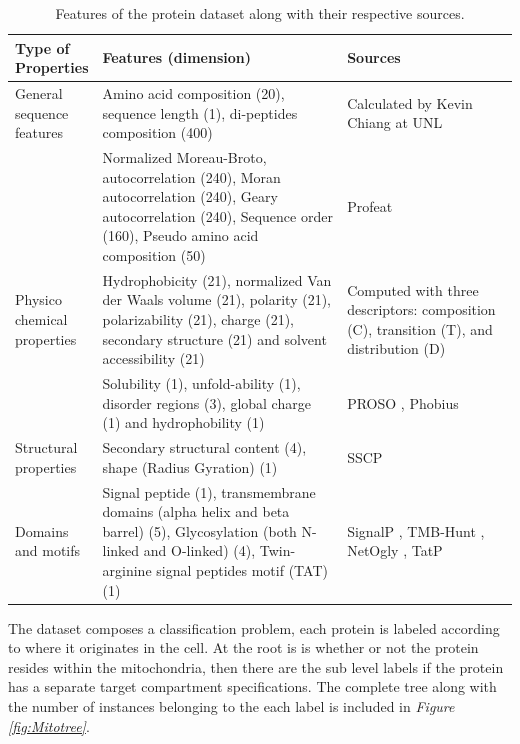 \documentclass[ms]{nuthesis}
\begin{document}
\FloatBarrier
\begin{table}[H]
  \centering
  \small
  \caption{Features of the protein dataset along with their respective sources.}
  \label{tab:featureList}
  \begin{tabular}{|p{0.15\linewidth}|p{0.5\linewidth}|p{0.35\linewidth}|} \toprule
    Type of Properties & Features (dimension) & Sources \\ \midrule
    General sequence features & Amino acid composition (20), sequence length (1),
     di-peptides composition (400) & Calculated by Kevin Chiang at UNL \cite{bioPoster} \\
     & Normalized Moreau-Broto, autocorrelation
     (240), Moran autocorrelation (240), Geary autocorrelation (240),
     Sequence order (160), Pseudo amino acid composition (50) & Profeat \cite{PROFEAT1} \\ \midrule
    Physico chemical properties &  Hydrophobicity (21), normalized Van der Waals volume (21),
    polarity (21), polarizability (21), charge (21), secondary structure (21)
    and solvent accessibility (21) & Computed with three descriptors: composition (C),
    transition (T), and distribution (D) \cite{Cui2} \\
     & Solubility (1), unfold-ability (1),
    disorder regions (3), global charge (1) and hydrophobility (1) &
    PROSO \cite{PROSO3}, Phobius \cite{Phobius4} \\ \midrule
    Structural properties & Secondary structural content (4), shape
    (Radius Gyration) (1) & SSCP \cite{PSSCP5} \\ \midrule
    Domains and motifs & Signal peptide (1), transmembrane domains
    (alpha helix and beta barrel) (5), Glycosylation
    (both N-linked and O-linked) (4),
    Twin-arginine signal peptides motif (TAT) (1) & SignalP \cite{SignalP6},
    TMB-Hunt \cite{TMBHunt7}, NetOgly \cite{NetOgly8}, TatP \cite{TatP9} \\
      \bottomrule
  \end{tabular}
\end{table}
\FloatBarrier

\par The dataset composes a classification problem, each protein is labeled
 according to where it originates in the cell. At the root is is whether or not
 the protein resides within the mitochondria, then there are the sub level labels
 if the protein has a separate target compartment specifications. The complete
 tree along with the number of instances belonging to the each label
 is included in \textit{Figure \ref{fig:Mitotree}}.
\end{document}
